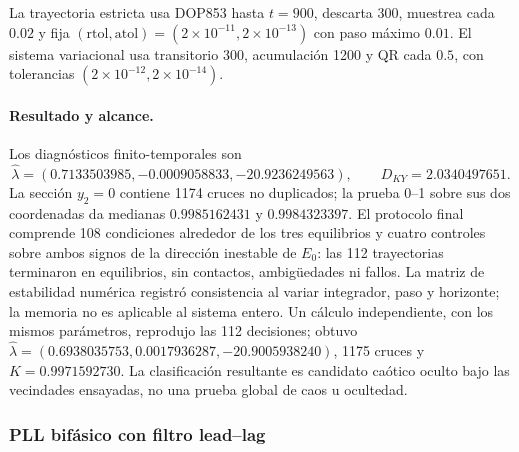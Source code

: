 La trayectoria estricta usa DOP853 hasta \(t=900\), descarta 300, muestrea cada
\(0.02\) y fija \((\mathrm{rtol},\mathrm{atol})=(2\times10^{-11},
2\times10^{-13})\) con paso máximo \(0.01\). El sistema variacional usa
transitorio 300, acumulación 1200 y QR cada \(0.5\), con tolerancias
\((2\times10^{-12},2\times10^{-14})\).

\paragraph{Resultado y alcance.}
Los diagnósticos finito-temporales son
\begin{equation}
 \widehat\lambda=(0.7133503985,-0.0009058833,-20.9236249563),
 \qquad D_{KY}=2.0340497651.
 \label{ncbench:eq:mavpd-chaos-results}
\end{equation}
La sección \(y_2=0\) contiene 1174 cruces no duplicados; la prueba 0--1
sobre sus dos coordenadas da medianas \(0.9985162431\) y \(0.9984323397\).
El protocolo final comprende 108 condiciones alrededor de los tres
equilibrios y cuatro controles sobre ambos signos de la dirección inestable de
\(E_0\): las 112 trayectorias terminaron en equilibrios, sin contactos,
ambigüedades ni fallos. La matriz de estabilidad numérica registró consistencia
al variar integrador, paso y horizonte; la memoria no es aplicable al sistema
entero. Un cálculo independiente, con los mismos parámetros, reprodujo las
112 decisiones; obtuvo
\(\widehat\lambda=(0.6938035753,0.0017936287,-20.9005938240)\), 1175 cruces y
\(K=0.9971592730\). La clasificación resultante es candidato caótico oculto bajo
las vecindades ensayadas, no una prueba global de caos u ocultedad.

\subsubsection{PLL bifásico con filtro lead--lag}

